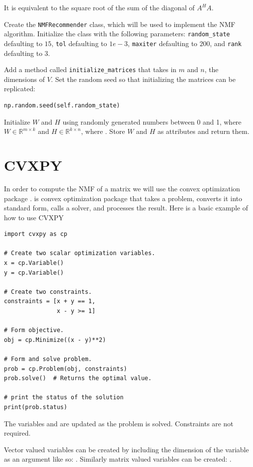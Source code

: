 It is equivalent to the square root of the sum of the diagonal of $A^{H}A$.



\begin{problem}
Create the \texttt{NMFRecommender} class, which will be used to implement the NMF algorithm.
Initialize the class with the following parameters: 
\texttt{random\_state} defaulting to $15$,
\texttt{tol} defaulting to $1e-3$, \texttt{maxiter} defaulting to $200$, and \texttt{rank} defaulting to $3$.


Add a method called \texttt{initialize\_matrices} that takes in $m$ and $n$, the dimensions of $V$.
Set the random seed so that initializing the matrices can be replicated:
\begin{lstlisting}
np.random.seed(self.random_state)
\end{lstlisting}
Initialize $W$ and $H$ using randomly generated numbers between 0 and 1, where $W\in\mathbb{R}^{m\times k}$ and $H\in\mathbb{R}^{k\times n}$, where .
Store $W$ and $H$ as attributes and return them.
\end{problem}

\section*{CVXPY}
In order to compute the NMF of a matrix we will use the convex optimization package .
 is convex optimization package that takes a problem, converts it into standard form, calls a solver, and processes the result.
Here is a basic example of how to use CVXPY
\begin{lstlisting}
import cvxpy as cp

# Create two scalar optimization variables.
x = cp.Variable()
y = cp.Variable()

# Create two constraints.
constraints = [x + y == 1,
               x - y >= 1]

# Form objective.
obj = cp.Minimize((x - y)**2)

# Form and solve problem.
prob = cp.Problem(obj, constraints)
prob.solve()  # Returns the optimal value.

# print the status of the solution
print(prob.status)
\end{lstlisting}
The variables  and  are updated as the problem is solved.
Constraints are not required.

Vector valued variables can be created by including the dimension of the variable as an argument like so: .
Similarly matrix valued variables can be created: .

